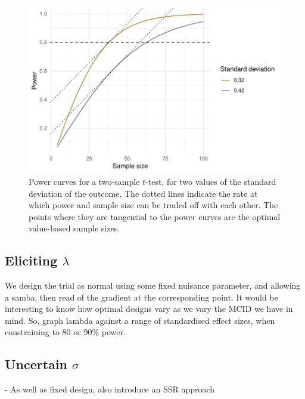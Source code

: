 \documentclass[sagev, Crown]{sagej}
\begin{document}
\begin{figure}
\centering
\includegraphics[scale=0.8]{./figures/p_curves}
\caption{Power curves for a two-sample $t$-test, for two values of the standard deviation of the outcome. The dotted lines indicate the rate at which power and sample size can be traded off with each other. The points where they are tangential to the power curves are the optimal value-based sample sizes.}
\label{fig:p_curves}
\end{figure}

\subsection{Eliciting $\lambda$}

We design the trial as normal using some fixed nuisance parameter, and allowing a samba, then read of the gradient at the corresponding point. It would be interesting to know how optimal designs vary as we vary the MCID we have in mind. So, graph lambda against a range of standardised effect sizes, when constraining to 80 or 90\% power.

\subsection{Uncertain $\sigma$}

- As well as fixed design, also introduce an SSR approach
\end{document}
